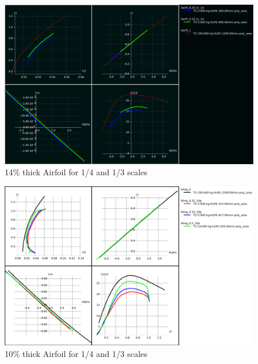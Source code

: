 \documentclass[titlepage,10pt]{article}
\begin{document}
\begin{figure}[h]
\begin{center}
\includegraphics[width=120mm]{scale_tc_14.png}
\end{center}
\caption{14\% thick Airfoil for 1/4 and 1/3 scales}
\label{fig:tc14}
\end{figure}

\begin{figure}[h]
\begin{center}
\includegraphics[width=120mm]{scale_tc_10.png}
\end{center}
\caption{10\% thick Airfoil for 1/4 and 1/3 scales}
\label{fig:tc10}
\end{figure}

\clearpage
\end{document}
